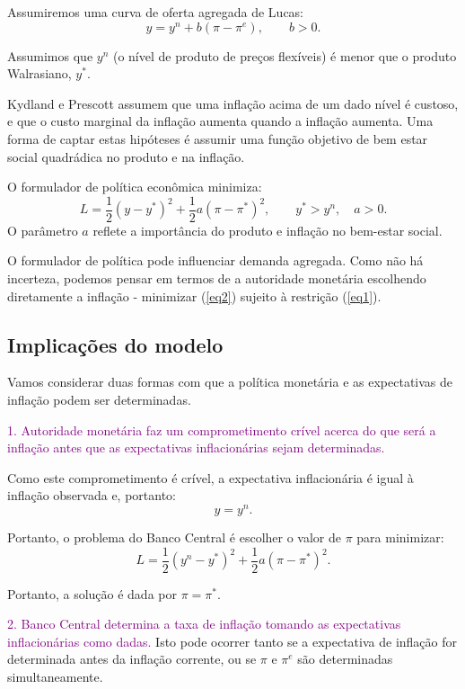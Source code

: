 \documentclass[12pt]{article}
\begin{document}
Assumiremos uma curva de oferta agregada de Lucas:
\begin{equation}
    y = y^n + b(\pi - \pi^e), \qquad b>0.
    \label{eq1}
\end{equation}

Assumimos que $y^n$ (o nível de produto de preços flexíveis) é menor que o produto Walrasiano, $y^*$.

Kydland e Prescott assumem que uma inflação acima de um dado nível é custoso, e que o custo marginal da inflação aumenta quando a inflação aumenta. Uma forma de captar estas hipóteses é assumir uma função objetivo de bem estar social quadrádica no produto e na inflação.

O formulador de política econômica minimiza:
\begin{equation}
    L = \frac{1}{2}(y-y^*)^2 + \frac{1}{2}a(\pi-\pi^*)^2, \qquad y^*>y^n, \quad a>0.
    \label{eq2}
\end{equation}
O parâmetro $a$ reflete a importância do produto e inflação no bem-estar social.

O formulador de política pode influenciar demanda agregada. Como não há incerteza, podemos pensar em termos de a autoridade monetária escolhendo diretamente a inflação - minimizar (\ref{eq2}) sujeito à restrição (\ref{eq1}). 

\subsection{Implicações do modelo}
Vamos considerar duas formas com que a política monetária e as expectativas de inflação podem ser determinadas.

\textcolor{purple}{1. Autoridade monetária faz um comprometimento crível acerca do que será a inflação antes que as expectativas inflacionárias sejam determinadas.}

Como este comprometimento é crível, a expectativa inflacionária é igual à inflação observada e, portanto:
\[
y = y^n.
\]

Portanto, o problema do Banco Central é escolher o valor de $\pi$ para minimizar:
\[
L = \frac{1}{2}(y^n - y^*)^2 + \frac{1}{2}a(\pi-\pi^*)^2.
\]

Portanto, a solução é dada por $\pi = \pi^*$.

\textcolor{purple}{2. Banco Central determina a taxa de inflação tomando as expectativas inflacionárias como dadas.} Isto pode ocorrer tanto se a expectativa de inflação for determinada antes da inflação corrente, ou se $\pi$ e $\pi^e$ são determinadas simultaneamente.
\end{document}

